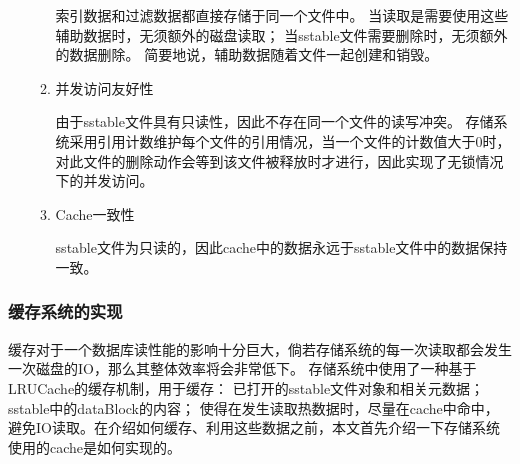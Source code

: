 \begin{enumerate}
\begin{enumerate}
索引数据和过滤数据都直接存储于同一个文件中。
当读取是需要使用这些辅助数据时，无须额外的磁盘读取；
当sstable文件需要删除时，无须额外的数据删除。
简要地说，辅助数据随着文件一起创建和销毁。

\item 并发访问友好性

由于sstable文件具有只读性，因此不存在同一个文件的读写冲突。
存储系统采用引用计数维护每个文件的引用情况，当一个文件的计数值大于0时，对此文件的删除动作会等到该文件被释放时才进行，因此实现了无锁情况下的并发访问。

\item Cache一致性

sstable文件为只读的，因此cache中的数据永远于sstable文件中的数据保持一致。
				\end{enumerate}
			\end{enumerate}


		\subsubsection{缓存系统的实现}

		缓存对于一个数据库读性能的影响十分巨大，倘若存储系统的每一次读取都会发生一次磁盘的IO，那么其整体效率将会非常低下。
		存储系统中使用了一种基于LRUCache的缓存机制，用于缓存：
		已打开的sstable文件对象和相关元数据；
		sstable中的dataBlock的内容；
		使得在发生读取热数据时，尽量在cache中命中，避免IO读取。在介绍如何缓存、利用这些数据之前，本文首先介绍一下存储系统使用的cache是如何实现的。
		
